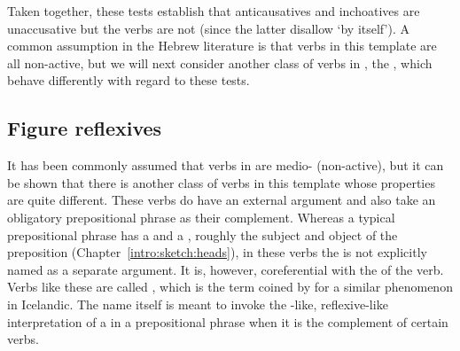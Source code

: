 \begin{exe}
\begin{xlist}
\begin{xlist}
\begin{exe}
\begin{xlist}
\begin{xlist}
\begin{exe}
\begin{xlist}
\begin{xlist}
\begin{exe}
\begin{exe}
\begin{xlist}
\begin{exe}
\begin{exe}
\begin{xlist}
		
 \z
\z 

Taken together, these tests establish that anticausatives and inchoatives are unaccusative but the  verbs are not (since the latter disallow `by itself'). A common assumption in the Hebrew literature is that verbs in this template are all non-active, but we will next consider another class of verbs in {\tnif}, the , which behave differently with regard to these tests.

	\subsection{Figure reflexives} \label{vz:tnif:figrefl}
It has been commonly assumed that verbs in {\tnif} are medio- (non-active), but it can be shown that there is another class of verbs in this template whose properties are quite different. These verbs do have an external argument and also take an obligatory prepositional phrase as their complement. Whereas a typical prepositional phrase has a  and a , roughly the subject and object of the preposition (Chapter~\ref{intro:sketch:heads}), in these verbs the  is not explicitly named as a separate argument. It is, however, coreferential with the  of the verb. Verbs like these are called \textsc{}, which is the term coined by \cite{wood14nllt} for a similar phenomenon in Icelandic. The name itself is meant to invoke the -like, reflexive-like interpretation of a  in a prepositional phrase when it is the complement of certain verbs.\label{r1:3:2}


\end{xlist}
\end{exe}
\end{exe}
\end{xlist}
\end{exe}
\end{exe}
\end{xlist}
\end{xlist}
\end{exe}
\end{xlist}
\end{xlist}
\end{exe}
\end{xlist}
\end{xlist}
\end{exe}
